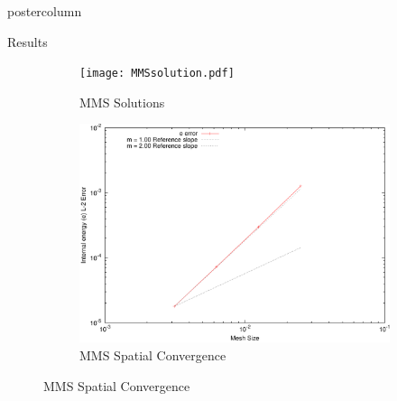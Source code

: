 \documentclass[xcolor=dvipsnames]{beamer}
\newcommand{\colb}[1]{{\color{blue} #1}}
\newcommand{\colr}[1]{{\color{red} #1}}
\begin{document}
\begin{frame}
\begin{columns}
\begin{column}{.49\textwidth}
\begin{beamercolorbox}[center,wd=\textwidth]{postercolumn}
\begin{minipage}[T]{0.95\textwidth}
{\begin{block}{Results}
\begin{figure}
\begin{subfigure}{0.49\textwidth}
  \centering
  \texttt{[image: MMSsolution.pdf]}
  \caption{\label{marshak_200_compare} MMS Solutions}
\end{subfigure}
\begin{subfigure}{0.49\textwidth}
  \centering
    \includegraphics[width=0.99\linewidth]{convergence_plot/e_convergence.pdf}
    \caption{\label{e_convergence} MMS Spatial Convergence}
\end{subfigure}
\end{figure}


\end{block}}
\end{minipage}
\end{beamercolorbox}
\end{column}
\end{columns}
\end{frame}
\end{document}
